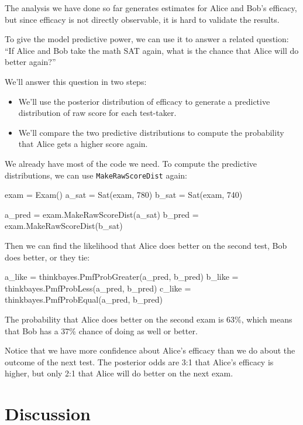 \documentclass[12pt]{book}
\theoremstyle{exercise}
\begin{document}
The analysis we have done so far generates estimates for
Alice and Bob's efficacy, but since efficacy is not directly
observable, it is hard to validate the results.

To give the model predictive power, we can use it to answer
a related question: ``If Alice and Bob take the math SAT
again, what is the chance that Alice will do better again?''

We'll answer this question in two steps:

\begin{itemize}

\item We'll use the posterior distribution of efficacy to
generate a predictive distribution of raw score for each test-taker.

\item We'll compare the two predictive distributions to compute
the probability that Alice gets a higher score again.

\end{itemize}

We already have most of the code we need.  To compute
the predictive distributions, we can use \verb"MakeRawScoreDist" again:

\begin{code}
    exam = Exam()
    a_sat = Sat(exam, 780)
    b_sat = Sat(exam, 740)

    a_pred = exam.MakeRawScoreDist(a_sat)
    b_pred = exam.MakeRawScoreDist(b_sat)
\end{code}

Then we can find the likelihood that Alice does better on the second
test, Bob does better, or they tie:

\begin{code}
    a_like = thinkbayes.PmfProbGreater(a_pred, b_pred)
    b_like = thinkbayes.PmfProbLess(a_pred, b_pred)
    c_like = thinkbayes.PmfProbEqual(a_pred, b_pred)
\end{code}

The probability that Alice does better on the second exam is 63\%,
which means that Bob has a 37\% chance of doing as well or better.

Notice that we have more confidence about Alice's efficacy than we do
about the outcome of the next test.  The posterior odds are 3:1 that
Alice's efficacy is higher, but only 2:1 that Alice will do better on
the next exam.


\section{Discussion}
\end{document}
